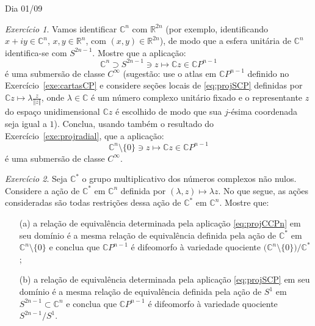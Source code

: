\documentclass[oneside,11pt]{amsart}
\newcommand{\R}{\mathds R}
\newcommand{\C}{\mathds C}
\theoremstyle{remark}\newtheorem{exercise}{Exercício}[section]
\theoremstyle{plain}\newtheorem{teo}{Teorema}[section]
\theoremstyle{plain}\newtheorem{lem}[teo]{Lema}
\theoremstyle{plain}\newtheorem{prop}[teo]{Proposição}
\theoremstyle{definition}\newtheorem{defin}[teo]{Definição}
\theoremstyle{remark}\newtheorem{rem}[teo]{Observação}
\theoremstyle{definition}\newtheorem{example}[teo]{Exemplo}
\numberwithin{equation}{section}
\begin{document}
\begin{section}{Dia 01/09}
\begin{exercise}
Vamos identificar $\C^n$ com $\R^{2n}$ (por exemplo, identificando $x+iy\in\C^n$, $x,y\in\R^n$, com $(x,y)\in\R^{2n}$),
de modo que a esfera unitária de $\C^n$ identifica-se com $S^{2n-1}$. Mostre que a aplicação:
\begin{equation}\label{eq:projSCP}
\C^n\supset S^{2n-1}\ni z\longmapsto\C z\in \C P^{n-1}
\end{equation}
é uma submersão de classe $C^\infty$ (sugestão: use o atlas em $\C P^{n-1}$ definido no Exercício~\ref{exe:cartasCP}
e considere seções locais de \eqref{eq:projSCP} definidas por $\C z\mapsto\lambda\frac z{\Vert z\Vert}$,
onde $\lambda\in\C$ é um número complexo unitário fixado e o representante $z$ do espaço unidimensional $\C z$ é escolhido
de modo que sua $j$-ésima coordenada seja igual a $1$). Conclua, usando também o resultado do Exercício~\ref{exe:projradial},
que a aplicação:
\begin{equation}\label{eq:projCCPn}
\C^n\setminus\{0\}\ni z\longmapsto\C z\in\C P^{n-1}
\end{equation}
é uma submersão de classe $C^\infty$.
\end{exercise}

\begin{exercise}\label{exe:quocCP}
Seja $\C^*$ o grupo multiplicativo dos números complexos não nulos.
Considere a ação de $\C^*$ em $\C^n$ definida por $(\lambda,z)\mapsto\lambda z$. No que segue, as ações consideradas são todas restrições
dessa ação de $\C^*$ em $\C^n$. Mostre que:
\begin{itemize}
\item[(a)] a relação de equivalência determinada pela aplicação \eqref{eq:projCCPn} em seu domínio é a mesma relação de equivalência definida pela
ação de $\C^*$ em $\C^n\setminus\{0\}$ e conclua que $\C P^{n-1}$ é difeomorfo à variedade quociente $\big(\C^n\setminus\{0\}\big)/\C^*$;
\item[(b)] a relação de equivalência determinada pela aplicação \eqref{eq:projSCP} em seu domínio é a mesma relação de equivalência definida pela
ação de $S^1$ em $S^{2n-1}\subset\C^n$ e conclua que $\C P^{n-1}$ é difeomorfo à variedade quociente $S^{2n-1}/S^1$.
\end{itemize}
\end{exercise}


\end{section}
\end{document}
